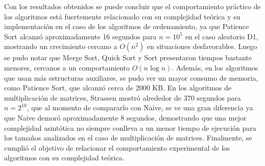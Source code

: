 Con los resultados obtenidos se puede concluir que el comportamiento práctico de los algoritmos está fuertemente relacionado con su complejidad teórica y su implementación en el caso de los algoritmos de ordenamiento, ya que Patience Sort alcanzó aproximadamente 16 segundos para $n=10^5$ en el caso aleatorio D1, mostrando un crecimiento cercano a $O(n^2)$ en situaciones desfavorables. Luego se pudo notar que Merge Sort, Quick Sort y Sort presentaron tiempos bastante menores, cercanos a un comportamiento $O(n\log n)$. Además, en los algoritmos que usan más estructuras auxiliares, se pudo ver un mayor consumo de memoria, como Patience Sort, que alcanzó cerca de 2000 KB. En los algoritmos de multiplicación de matrices, Strassen mostró alrededor de 370 segundos para $n=2^{10}$, que al momento de compararlo con Naive, se ve una gran diferencia ya que Naive demoró aproximadamente 8 segundos, demostrando que una mejor complejidad asintótica no siempre conlleva a un menor tiempo de ejecución para los tamaños analizados en el caso de multiplicación de matrices. Finalmente, se cumplió el objetivo de relacionar el comportamiento experimental de los algoritmos con su complejidad teórica.
